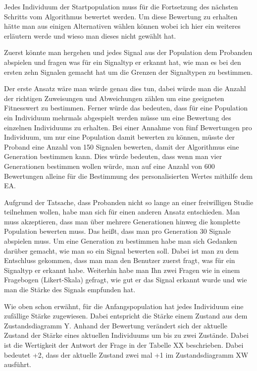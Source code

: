Jedes Individuum der Startpopulation muss f{\"u}r die Fortsetzung des n{\"a}chsten Schritts vom Algorithmus bewertet werden.
Um diese Bewertung zu erhalten h{\"a}tte man aus einigen Alternativen w{\"a}hlen k{\"o}nnen wobei ich hier ein weiteres erl{\"a}utern werde und wieso man dieses nicht gew{\"a}hlt hat. 

Zuerst k{\"o}nnte man hergehen und jedes Signal aus der Population dem Probanden abspielen und fragen was f{\"u}r ein Signaltyp er erkannt hat, wie man es bei den ersten zehn Signalen gemacht hat um die Grenzen der Signaltypen zu bestimmen. 

Der erste Ansatz w{\"a}re man w{\"u}rde genau dies tun, dabei w{\"u}rde man die Anzahl der richtigen Zuweisungen und Abweichungen z{\"a}hlen um eine geeigneten Fitnesswert zu bestimmen. Ferner w{\"u}rde das bedeuten, dass f{\"u}r eine Population ein Individuum mehrmals abgespielt werden m{\"u}sse um eine Bewertung des einzelnen Individuums zu erhalten. Bei einer Annahme von f{\"u}nf Bewertungen pro Individuum, um nur eine Population damit bewerten zu k{\"o}nnen, m{\"u}sste der Proband eine Anzahl von 150 Signalen bewerten, damit der Algorithmus eine Generation bestimmen kann. Dies w{\"u}rde bedeuten, dass wenn man vier Generationen bestimmen wollen w{\"u}rde, man auf eine Anzahl von 600 Bewertungen alleine f{\"u}r die Bestimmung des personalisierten Wertes mithilfe dem EA. 

Aufgrund der Tatsache, dass Probanden nicht so lange an einer freiwilligen Studie teilnehmen wollen, habe man sich f{\"u}r einen anderen Ansatz entschieden. Man muss akzeptieren, dass man {\"u}ber mehrere Generationen hinweg die komplette Population bewerten muss. Das hei{\ss}t, dass man pro Generation 30 Signale abspielen muss. Um eine Generation zu bestimmen habe man sich Gedanken dar{\"u}ber gemacht, wie man so ein Signal bewerten soll. Dabei ist man zu dem Entschluss gekommen, dass man man den Benutzer zuerst fragt, was f{\"u}r ein Signaltyp er erkannt habe. Weiterhin habe man Ihn zwei Fragen wie in einem Fragebogen (Likert-Skala) gefragt, wie gut er das Signal erkannt wurde und wie man die St{\"a}rke des Signals empfunden hat. 

Wie oben schon erw{\"a}hnt,  f{\"u}r die Anfangspopulation hat jedes Individuum eine zuf{\"a}llige St{\"a}rke zugewiesen. Dabei entspricht die St{\"a}rke einem Zustand aus dem Zustandsdiagramm Y. Anhand der Bewertung ver{\"a}ndert sich der aktuelle Zustand der St{\"a}rke eines aktuellen Individuums um bis zu zwei Zust{\"a}nde. Dabei ist die Wertigkeit der Antwort der Frage in der Tabelle XX beschrieben. Dabei bedeutet +2, dass der aktuelle Zustand zwei mal +1 im Zustandsdiagramm XW ausf{\"u}hrt. 

